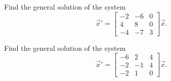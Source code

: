 \begin{exercise}\ansMark%
Find the general solution of the system
\begin{equation*}
{\vec{x}}' = \begin{bmatrix} -2 & -6 & 0 \\ 4 & 8 & 0 \\ -4 & -7 & 3 \end{bmatrix} \vec{x}.
\end{equation*}
\end{exercise}
%

\begin{exercise}\ansMark%
Find the general solution of the system
\begin{equation*}
{\vec{x}}' = \begin{bmatrix} -6 & 2 & 4 \\ -2 & -1 & 4 \\ -2 & 1 & 0 \end{bmatrix} \vec{x}.
\end{equation*}
\end{exercise}
%

